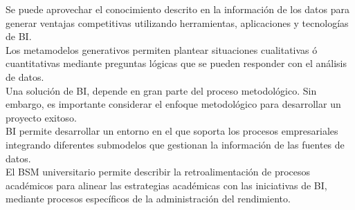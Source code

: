 \documentclass[12pt,jou]{apa7}
\begin{document}
Se puede aprovechar el conocimiento descrito en la información de los datos para generar ventajas competitivas utilizando herramientas, aplicaciones y tecnologías de BI.\\

Los metamodelos generativos permiten plantear situaciones cualitativas ó cuantitativas mediante preguntas lógicas que se pueden responder con el análisis de datos.\\

Una solución de BI, depende en gran parte del proceso metodológico. Sin embargo, es importante considerar el enfoque metodológico para desarrollar un proyecto exitoso.\\

BI permite desarrollar un entorno en el que soporta los procesos empresariales integrando diferentes submodelos que gestionan la información de las fuentes de datos.\\

El BSM universitario permite describir la retroalimentación de procesos académicos para alinear las estrategias académicas con las iniciativas de BI, mediante procesos específicos de la administración del rendimiento.
\end{document}
